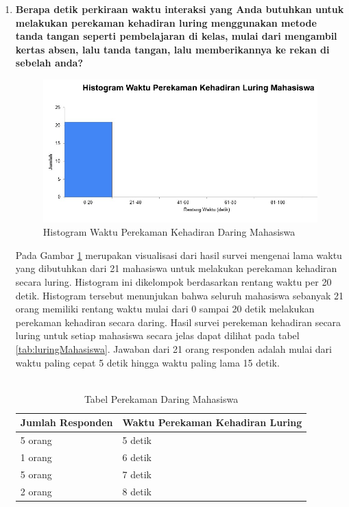 \documentclass[a4paper,twoside]{article}
\begin{document}
\begin{enumerate}
\begin{enumerate}
			\item \textbf{Berapa detik perkiraan waktu interaksi yang Anda butuhkan untuk melakukan perekaman kehadiran luring menggunakan metode tanda tangan seperti pembelajaran di kelas, mulai dari mengambil kertas absen, lalu tanda tangan, lalu memberikannya ke rekan di sebelah anda?}
			\begin{figure}[H]
				\centering
				\includegraphics[scale=0.7]{Gambar/LuringMahasiswa.jpg}
				\caption{Histogram Waktu Perekaman Kehadiran Daring Mahasiswa} 
				\label{fig:LuringMahasiswa}
			\end{figure}
			Pada Gambar \ref{fig:LuringMahasiswa} merupakan visualisasi dari hasil survei mengenai lama waktu yang dibutuhkan dari 21 mahasiswa untuk melakukan perekaman kehadiran secara luring. Histogram ini dikelompok berdasarkan rentang waktu per 20 detik. Histogram tersebut menunjukan bahwa seluruh mahasiswa sebanyak 21 orang memiliki rentang waktu mulai dari 0 sampai 20 detik melakukan perekaman kehadiran secara daring. Hasil survei perekeman kehadiran secara luring untuk setiap mahasiswa secara jelas dapat dilihat pada tabel \ref{tab:luringMahasiswa}.
			Jawaban dari 21 orang responden adalah mulai dari waktu paling cepat 5 detik hingga waktu paling lama 15 detik.\\ \\
			\begin{table}[ht]			
				\caption{Tabel Perekaman Daring Mahasiswa}
				\centering
				\begin{tabular}{|p{4cm} |p{7cm}|}\hline
					Jumlah Responden &  Waktu Perekaman Kehadiran Luring \\ \hline     
					5 orang &  5 detik\\ \hline 
					1 orang &  6 detik\\ \hline 
					5 orang &  7 detik\\ \hline 
					2 orang &  8 detik\\ \hline 

\end{tabular}
\end{table}
\end{enumerate}
\end{enumerate}
\end{document}
